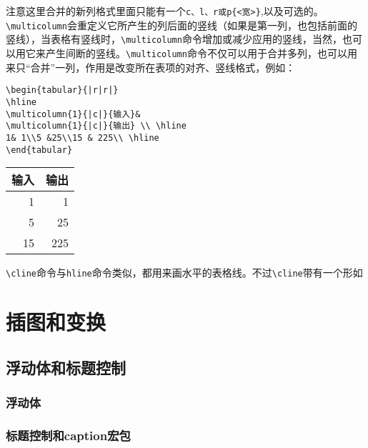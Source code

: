 注意这里合并的新列格式里面只能有一个\verb|c、l、r或p{<宽>}|,以及可选的。\verb|\multicolumn|会重定义它所产生的列后面的竖线（如果是第一列，也包括前面的竖线），当表格有竖线时，\verb|\multicolumn|命令增加或减少应用的竖线，当然，也可以用它来产生间断的竖线。\verb|\multicolumn|命令不仅可以用于合并多列，也可以用来只“合并”一列，作用是改变所在表项的对齐、竖线格式，例如：
\begin{table}[ht]
	\begin{minipage}{0.7\linewidth}
		\begin{lstlisting}
\begin{tabular}{|r|r|}
\hline
\multicolumn{1}{|c|}{输入}&
\multicolumn{1}{|c|}{输出} \\ \hline
1& 1\\5 &25\\15 & 225\\ \hline
\end{tabular}
		\end{lstlisting}
	\end{minipage}
	\quad
	\begin{tabular}{|r|r|}
		\hline
		\multicolumn{1}{|c|}{输入}&
		\multicolumn{1}{|c|}{输出} \\ \hline
		1& 1\\5 &25\\
		15 & 225\\ \hline
	\end{tabular}
\end{table}
\verb|\cline|命令与\verb|hline|命令类似，都用来画水平的表格线。不过\verb|\cline|带有一个形如
\section{插图和变换}
\subsection{浮动体和标题控制}
\subsubsection{浮动体}
\subsubsection{标题控制和caption宏包}
